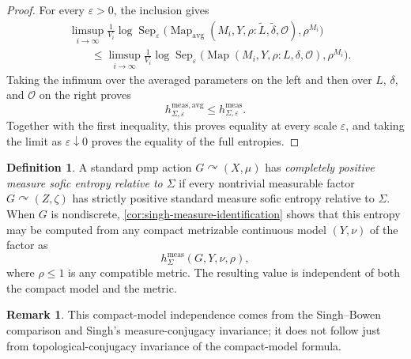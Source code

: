 \documentclass[12pt]{amsart}
\newtheorem{proposition}[proposition]{Proposition}
\theoremstyle{definition}
\newtheorem{definition}[definition]{Definition}
\newtheorem{remark}[remark]{Remark}
\newcommand{\Map}{\operatorname{Map}}
\newcommand{\Mapavg}{\operatorname{Map}_{\mathrm{avg}}}
\newcommand{\Sep}{\operatorname{Sep}}
\newcommand{\cO}{\mathcal O}
\newcommand{\1}{\mathbf 1}
\newcommand{\eps}{\varepsilon}
\begin{document}
\begin{proof}
For every $\eps>0$, the inclusion gives
\begin{align*}
 &\limsup_{i\to\infty}\frac1{V_i}\log\Sep_\eps
 \bigl(\Mapavg(M_i,Y,\rho:\widetilde L,\widetilde\delta,\cO),\rho^{M_i}\bigr)\\
 &\qquad\leq
 \limsup_{i\to\infty}\frac1{V_i}\log\Sep_\eps
 \bigl(\Map(M_i,Y,\rho:L,\delta,\cO),\rho^{M_i}\bigr).
\end{align*}
Taking the infimum over the averaged parameters on the left and then over $L$, $\delta$, and $\cO$ on the right proves
\[
 h^{\mathrm{meas,avg}}_{\Sigma,\eps}
 \leq h^{\mathrm{meas}}_{\Sigma,\eps}.
\]
Together with the first inequality, this proves equality at every scale $\eps$, and taking the limit as $\eps\downarrow0$ proves the equality of the full entropies.
\end{proof}





	\begin{definition}\label{def:cpe}
	A standard pmp action $G\curvearrowright(X,\mu)$ has
	\emph{completely positive measure sofic entropy relative to $\Sigma$} if
	every nontrivial measurable factor $G\curvearrowright(Z,\zeta)$ has
	strictly positive standard measure sofic entropy relative to $\Sigma$.
	When $G$ is nondiscrete, \cref{cor:singh-measure-identification} shows that
	this entropy may be computed from any compact metrizable continuous model
	$(Y,\nu)$ of the factor as
	\[
	h^{\mathrm{meas}}_\Sigma(G,Y,\nu,\rho),
	\]
	where $\rho\leq1$ is any compatible metric. The resulting value is
	independent of both the compact model and the metric.
\end{definition}
\begin{remark}\label{rem:cpe-model-independence}
	This compact-model independence comes from the Singh--Bowen comparison and
	Singh's measure-conjugacy invariance; it does not follow just from
	topological-conjugacy invariance of the compact-model formula.
\end{remark}
\end{document}
